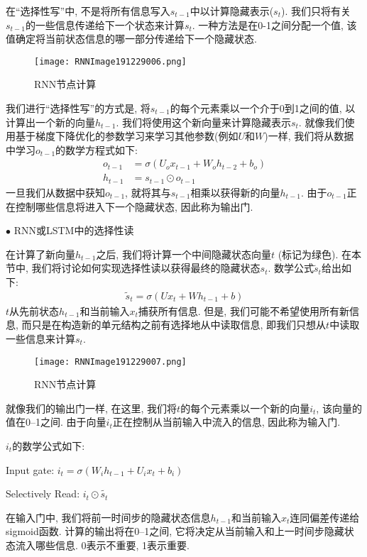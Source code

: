 \begin{example}
在“选择性写”中, 不是将所有信息写入$s_{t-1}$中以计算隐藏表示($s_t$). 我们只将有关$s_{t-1}$的一些信息传递给下一个状态来计算$s_t$.
一种方法是在0-1之间分配一个值, 该值确定将当前状态信息的哪一部分传递给下一个隐藏状态.
\begin{figure}[H]
\centering
\texttt{[image: RNNImage191229006.png]}
\caption{RNN节点计算}
\label{RNNImage191229006}
\end{figure}
我们进行“选择性写”的方式是, 将$s_{t-1}$的每个元素乘以一个介于0到1之间的值, 以计算出一个新的向量$h_{t-1}$. 我们将使用这个新向量来计算隐藏表示$s_t$.
就像我们使用基于梯度下降优化的参数学习来学习其他参数(例如$U$和$W$)一样, 我们将从数据中学习$o_{t-1}$的数学方程式如下:
\begin{align}
o_{t-1}&=\sigma\left(U_{o} x_{t-1}+W_{o} h_{t-2}+b_{o}\right)\\
h_{t-1}&=s_{t-1} \odot o_{t-1}
\end{align}
一旦我们从数据中获知$o_{t-1}$, 就将其与$s_{t-1}$相乘以获得新的向量$h_{t-1}$. 由于$o_{t-1}$正在控制哪些信息将进入下一个隐藏状态, 因此称为输出门.

$\bullet$ RNN或LSTM中的选择性读

在计算了新向量$h_{t-1}$之后, 我们将计算一个中间隐藏状态向量$t$ (标记为绿色). 在本节中, 我们将讨论如何实现选择性读以获得最终的隐藏状态$s_t$.
数学公式$\tilde{s}_{t}$给出如下:
\begin{align}
  \tilde{s}_{t}=\sigma\left(U x_{t}+W h_{t-1}+b\right)
\end{align}
$t$从先前状态$h_{t-1}$和当前输入$x_t$捕获所有信息.
但是, 我们可能不希望使用所有新信息, 而只是在构造新的单元结构之前有选择地从中读取信息,
即我们只想从$t$中读取一些信息来计算$s_t$.
\begin{figure}[H]
\centering
\texttt{[image: RNNImage191229007.png]}
\caption{RNN节点计算}
\label{RNNImage191229007}
\end{figure}
就像我们的输出门一样, 在这里, 我们将$t$的每个元素乘以一个新的向量$i_t$, 该向量的值在0–1之间. 由于向量$i_t$正在控制从当前输入中流入的信息, 因此称为输入门.

$i_t$的数学公式如下:

\quad Input gate: $i_{t}=\sigma\left(W_{i} h_{t-1}+U_{i} x_{t}+b_{i}\right)$

\quad Selectively Read: $i_{t} \odot \tilde{s_{t}}$

在输入门中, 我们将前一时间步的隐藏状态信息$h_{t-1}$和当前输入$x_t$连同偏差传递给sigmoid函数. 计算的输出将在0–1之间, 它将决定从当前输入和上一时间步隐藏状态流入哪些信息. 0表示不重要, 1表示重要.


\end{example}
